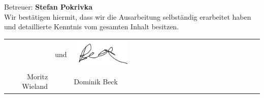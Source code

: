 \documentclass[11pt]{betterallrounder}
\begin{document}
\begin{titlepage}
\begin{center}
        {\large Betreuer: \bfseries{Stefan Pokrivka}}\\[1cm]

        {\large Wir bestätigen hiermit, dass wir die Ausarbeitung selbständig erarbeitet haben und
        detaillierte Kenntnis vom gesamten Inhalt besitzen.}\\[1cm]

        \begin{tabular}{rcl}
            \hrulefill & und &  \includegraphics[width=0.3\textwidth]{bilder/test.png}\\
            Moritz Wieland & & Dominik Beck
        \end{tabular}
    
        \vfill
    \end{center}
\end{titlepage}


\newpage

\tableofcontents


%


%







\end{document}
